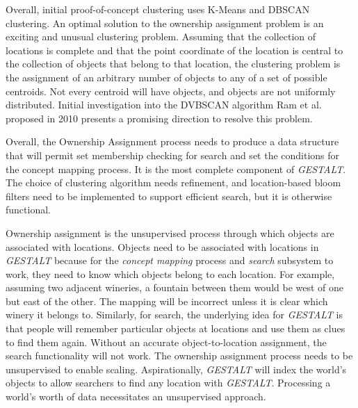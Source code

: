 Overall, initial proof-of-concept clustering uses K-Means and DBSCAN clustering. An optimal solution to the ownership assignment problem is an exciting and unusual clustering problem. 
Assuming that the collection of locations is complete and that the point coordinate of the location is central to the collection of objects that belong to that location, the clustering problem is the assignment of an arbitrary number of objects to any of a set of possible centroids. Not every centroid will have objects, and objects are not uniformly distributed. Initial investigation into the DVBSCAN algorithm Ram et al. proposed in 2010 presents a promising direction to resolve this problem.\cite{Ram2010} 

Overall, the Ownership Assignment process needs to produce a data structure that will permit set membership checking for search and set the conditions for the concept mapping process. It is the most complete component of \textit{GESTALT}. The choice of clustering algorithm needs refinement, and location-based bloom filters need to be implemented to support efficient search, but it is otherwise functional. 



Ownership assignment is the unsupervised process through which objects are associated with locations. 
Objects need to be associated with locations in \textit{GESTALT} because for the \textit{concept mapping} process and \textit{search} subsystem to work, they need to know which objects belong to each location.
For example, assuming two adjacent wineries, a fountain between them would be west of one but east of the other. The mapping will be incorrect unless it is clear which winery it belongs to. 
Similarly, for search, the underlying idea for \textit{GESTALT} is that people will remember particular objects at locations and use them as clues to find them again. Without an accurate object-to-location assignment, the search functionality will not work. 
The ownership assignment process needs to be unsupervised to enable scaling. Aspirationally, \textit{GESTALT} will index the world's objects to allow searchers to find any location with \textit{GESTALT}. Processing a world's worth of data necessitates an unsupervised approach. 

